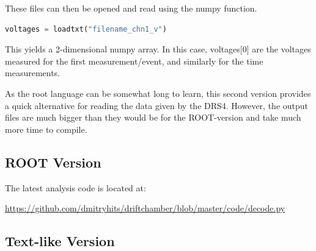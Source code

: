 \documentclass[12pt]{article}
\begin{document}
These files can then be opened and read using the numpy function.
\begin{lstlisting}[language=Python]
    voltages = loadtxt("filename_chn1_v")
\end{lstlisting}
This yields a 2-dimensional numpy array. In this case, voltages[0] are the voltages measured for the first measurement/event, and similarly for the time measurements.

As the root language can be somewhat long to learn, this second version provides a quick alternative for reading the data given by the DRS4. However, the output files are much bigger than they would be for the ROOT-version and take much more time to compile.

\subsection{ROOT Version}
The latest analysis code is located at:

\url{https://github.com/dmitryhits/driftchamber/blob/master/code/decode.py}


\subsection{Text-like Version}

\end{document}
